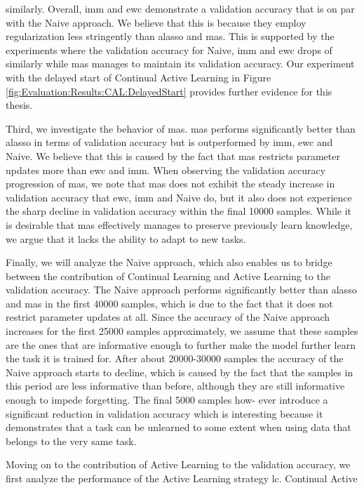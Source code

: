 similarly. Overall, \gls{imm} and \gls{ewc} demonstrate a validation accuracy that is on par with the Naive approach. We believe that this is because they employ regularization
less stringently than \gls{alasso} and \gls{mas}. This is supported by the experiments where the validation accuracy for Naive, \gls{imm} and \gls{ewc} drops of similarly while \gls{mas}
manages to maintain its validation accuracy. Our experiment with the delayed start of Continual Active Learning in Figure \ref{fig:Evaluation:Results:CAL:DelayedStart}
provides further evidence for this thesis. \par
Third, we investigate the behavior of \gls{mas}. \gls{mas} performs significantly better than \gls{alasso} in terms of validation accuracy but is outperformed by \gls{imm}, \gls{ewc} and Naive.
We believe that this is caused by the fact that \gls{mas} restricts parameter updates more than \gls{ewc} and \gls{imm}. When observing the validation accuracy progression of \gls{mas}, we note
that \gls{mas} does not exhibit the steady increase in validation accuracy that \gls{ewc}, \gls{imm} and Naive do, but it also does not experience the sharp decline in validation accuracy
within the final 10000 samples. While it is desirable that \gls{mas} effectively manages to preserve previously learn knowledge, we argue that it lacks the ability to adapt
to new tasks. \par
Finally, we will analyze the Naive approach, which also enables us to bridge between the contribution of Continual Learning and Active Learning to the validation accuracy.
The Naive approach performs significantly better than \gls{alasso} and \gls{mas} in the first 40000 samples, which is due to the fact that it does not restrict parameter updates
at all. Since the accuracy of the Naive approach increases for the first 25000 samples approximately, we assume that these samples are the ones that are informative enough
to further make the model further learn the task it is trained for. After about 20000-30000 samples the accuracy of the Naive approach starts to decline, which is caused
by the fact that the samples in this period are less informative than before, although they are still informative enough to impede forgetting. The final 5000 samples how-
ever introduce a significant reduction in validation accuracy which is interesting because it demonstrates that a task can be unlearned to some extent when using data that
belongs to the very same task. \par
Moving on to the contribution of Active Learning to the validation accuracy, we first analyze the performance of the Active Learning strategy \gls{lc}. Continual Active
